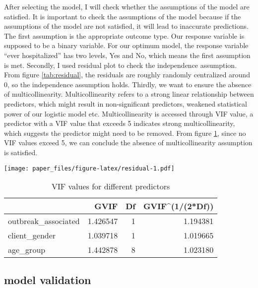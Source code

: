 \documentclass[
]{article}
\begin{document}
After selecting the model, I will check whether the assumptions of the model are satisfied. It is important to check the assumptions of the model because if the assumptions of the model are not satisfied, it will lead to inaccurate predictions.
The first assumption is the appropriate outcome type. Our response variable is supposed to be a binary variable. For our optimum model, the response variable ``ever hospitalized'' has two levels, Yes and No, which means the first assumption is met. Secondly, I used residual plot to check the independence assumption. From figure \ref{tab:residual}, the residuals are roughly randomly centralized around 0, so the independence assumption holds. Thirdly, we want to ensure the absence of multicollinearity. Multicollinearity refers to a strong linear relationship between predictors, which might result in non-significant predictors, weakened statistical power of our logistic model etc. Multicollinearity is accessed through VIF value, a predictor with a VIF value that exceeds 5 indicates strong multicollinearity, which suggests the predictor might need to be removed. From figure \ref{tab:vif}, since no VIF values exceed 5, we can conclude the absence of multicollinearity assumption is satisfied.

\texttt{[image: paper\_files/figure-latex/residual-1.pdf]}

\begin{table}

\caption{\label{tab:vif}VIF values for different predictors}
\centering
\begin{tabular}[t]{l|r|r|r}
\hline
  & GVIF & Df & GVIF\textasciicircum{}(1/(2*Df))\\
\hline
outbreak\_associated & 1.426547 & 1 & 1.194381\\
\hline
client\_gender & 1.039718 & 1 & 1.019665\\
\hline
age\_group & 1.442878 & 8 & 1.023180\\
\hline
\end{tabular}
\end{table}

\hypertarget{model-validation}{%
\subsection{model validation}\label{model-validation}}
\end{document}
